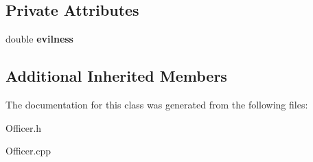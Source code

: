 \subsection*{Private Attributes}
\begin{DoxyCompactItemize}
\item 
\mbox{\label{classOfficer_a63465c5f16e8148e5bc0a3bb4ecd1781}} 
double {\bfseries evilness}
\end{DoxyCompactItemize}
\subsection*{Additional Inherited Members}


The documentation for this class was generated from the following files\+:\begin{DoxyCompactItemize}
\item 
Officer.\+h\item 
Officer.\+cpp\end{DoxyCompactItemize}
